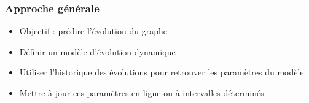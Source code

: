 \documentclass[c]{beamer}
\begin{document}
\begin{frame}
    \frametitle{Approche générale}
    \begin{itemize}
        \item Objectif : prédire l'évolution du graphe
        \item Définir un modèle d'évolution dynamique
        \item Utiliser l'historique des évolutions pour retrouver
            les paramètres du modèle
        \item Mettre à jour ces paramètres en ligne ou à intervalles déterminés
    \end{itemize}
\end{frame}
\end{document}
